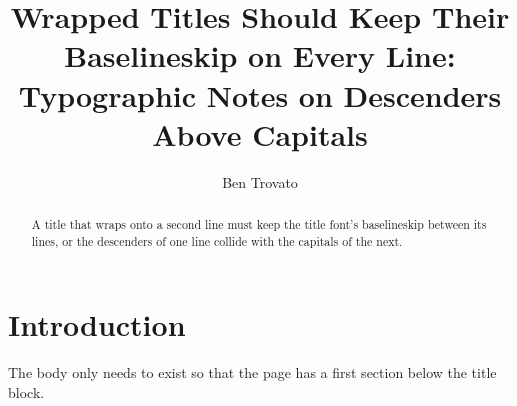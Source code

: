 \documentclass[acmsmall]{acmart}
\begin{document}
\title{Wrapped Titles Should Keep Their Baselineskip on Every Line: Typographic Notes on Descenders Above Capitals}

\author{Ben Trovato}

\renewcommand{\shortauthors}{Trovato}

\begin{abstract}
  A title that wraps onto a second line must keep the title font's baselineskip between its lines, or the descenders of one line collide with the capitals of the next.
\end{abstract}

\maketitle

\section{Introduction}
The body only needs to exist so that the page has a first section below the title block.
\end{document}
